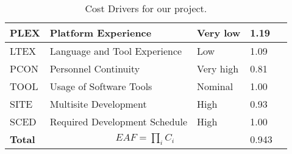 \begin{table}[h]
\begin{tabular}{| l | l | l | l | l |}
        \hline
        PLEX            & Platform Experience                       & Very low             & 1.19              \\
        \hline
        LTEX            & Language and Tool Experience              & Low                  & 1.09              \\
        \hline
        PCON            & Personnel Continuity                      & Very high            & 0.81              \\
        \hline
        TOOL            & Usage of Software Tools                   & Nominal              & 1.00              \\
        \hline
        SITE            & Multisite Development                     & High                 & 0.93              \\
        \hline
        SCED            & Required Development Schedule             & High                 & 1.00              \\
        \hline
        \textbf{Total}  & \multicolumn{2}{|c|}{$EAF=\prod_i C_i$}                              & 0.943             \\
        \hline
    \end{tabular}
    \caption{Cost Drivers for our project.}
    \label{tab:cost-drivers}
\end{table}
